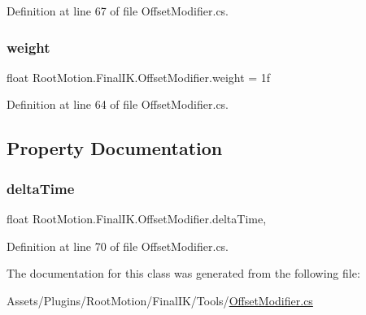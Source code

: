 Definition at line 67 of file Offset\+Modifier.\+cs.

\mbox{\label{class_root_motion_1_1_final_i_k_1_1_offset_modifier_a3a2cd2134e8a197e6a77b48fcf9aa5d4}} 
\subsubsection{\texorpdfstring{weight}{weight}}
{\footnotesize\ttfamily float Root\+Motion.\+Final\+I\+K.\+Offset\+Modifier.\+weight = 1f}



Definition at line 64 of file Offset\+Modifier.\+cs.



\subsection{Property Documentation}
\mbox{\label{class_root_motion_1_1_final_i_k_1_1_offset_modifier_ac5aeb27ca30313e6791867cbd4109940}} 
\subsubsection{\texorpdfstring{delta\+Time}{deltaTime}}
{\footnotesize\ttfamily float Root\+Motion.\+Final\+I\+K.\+Offset\+Modifier.\+delta\+Time\hspace{0.3cm}{\ttfamily [get]}, {\ttfamily [protected]}}



Definition at line 70 of file Offset\+Modifier.\+cs.



The documentation for this class was generated from the following file\+:\begin{DoxyCompactItemize}
\item 
Assets/\+Plugins/\+Root\+Motion/\+Final\+I\+K/\+Tools/\mbox{\hyperlink{_offset_modifier_8cs}{Offset\+Modifier.\+cs}}\end{DoxyCompactItemize}
